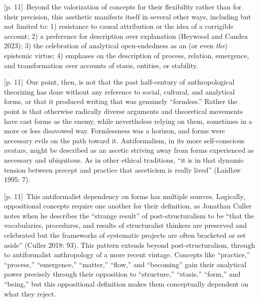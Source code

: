 \documentclass[10pt,a4paper]{article}
\begin{document}
{\scriptsize\color{gray} [p. 11]}\ Beyond the valorization of concepts for their flexibility rather than for their precision, this aesthetic manifests itself in several other ways, including but not limited to: 1) resistance to causal attribution or the idea of a corrigible account; 2) a preference for description over explanation (Heywood and Candea 2023); 3) the celebration of analytical open-endedness as an (or even \textit{the}) epistemic virtue; 4) emphases on the description of process, relation, emergence, and transformation over accounts of stasis, entities, or stability.\par
{\scriptsize\color{gray} [p. 11]}\ Our point, then, is not that the past half-century of anthropological theorizing has done without any reference to social, cultural, and analytical forms, or that it produced writing that was genuinely “formless.” Rather the point is that otherwise radically diverse arguments and theoretical movements have cast forms as the enemy, while nevertheless relying on them, sometimes in a more or less disavowed way. Formlessness was a horizon, and forms were necessary evils on the path toward it. Antiformalism, in its more self-conscious avatars, might be described as an ascetic striving away from forms experienced as necessary and ubiquitous. As in other ethical traditions, “it is in that dynamic tension between precept and practice that asceticism is really lived” (Laidlaw 1995: 7).\par
{\scriptsize\color{gray} [p. 11]}\ This antiformalist dependency on forms has multiple sources. Logically, oppositional concepts require one another for their definition, as Jonathan Culler notes when he describes the “strange result” of post-structuralism to be “that the vocabularies, procedures, and results of structuralist thinkers are preserved and celebrated but the frameworks of systematic projects are often bracketed or set aside” (Culler 2018: 93). This pattern extends beyond post-structuralism, through to antiformalist anthropology of a more recent vintage. Concepts like “practice,” “process,” “emergence,” “matter,” “flow,” and “becoming” gain their analytical power precisely through their opposition to “structure,” “stasis,” “form,” and “being,” but this oppositional definition makes them conceptually dependent on what they reject.\par
\end{document}
